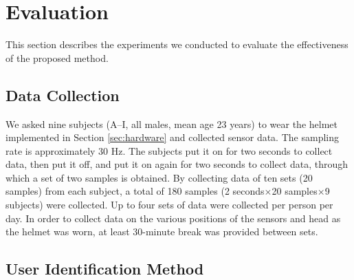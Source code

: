 \documentclass[sigchi,authordraft]{acmart}
\begin{document}
\section{Evaluation}
\label{sec:evaluation}
This section describes the experiments we conducted to evaluate the effectiveness of the proposed method.

\subsection{Data Collection}
We asked nine subjects (A--I, all males, mean age 23 years) to wear the helmet implemented in Section \ref{sec:hardware} and collected sensor data. The sampling rate is approximately 30 Hz. The subjects put it on for two seconds to collect data, then put it off, and put it on again for two seconds to collect data, through which a set of two samples is obtained. By collecting data of ten sets (20 samples) from each subject, a total of 180 samples (2 seconds$\times$20 samples$\times$9 subjects) were collected. Up to four sets of data were collected per person per day. In order to collect data on the various positions of the sensors and head as the helmet was worn, at least 30-minute break was provided between sets. 


\subsection{User Identification Method}
\end{document}
